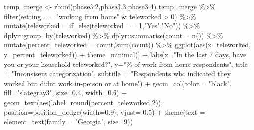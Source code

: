 \documentclass[
]{article}
\newenvironment{Shaded}{\begin{snugshade}}{\end{snugshade}}
\newcommand{\AttributeTok}[1]{\textcolor[rgb]{0.77,0.63,0.00}{#1}}
\newcommand{\DecValTok}[1]{\textcolor[rgb]{0.00,0.00,0.81}{#1}}
\newcommand{\FloatTok}[1]{\textcolor[rgb]{0.00,0.00,0.81}{#1}}
\newcommand{\FunctionTok}[1]{\textcolor[rgb]{0.00,0.00,0.00}{#1}}
\newcommand{\NormalTok}[1]{#1}
\newcommand{\OtherTok}[1]{\textcolor[rgb]{0.56,0.35,0.01}{#1}}
\newcommand{\SpecialCharTok}[1]{\textcolor[rgb]{0.00,0.00,0.00}{#1}}
\newcommand{\StringTok}[1]{\textcolor[rgb]{0.31,0.60,0.02}{#1}}
\begin{document}
\begin{Shaded}
\begin{Highlighting}[]
\NormalTok{temp\_merge }\OtherTok{\textless{}{-}} \FunctionTok{rbind}\NormalTok{(phase3}\FloatTok{.2}\NormalTok{,phase3}\FloatTok{.3}\NormalTok{,phase3}\FloatTok{.4}\NormalTok{)}
\NormalTok{temp\_merge }\SpecialCharTok{\%\textgreater{}\%}
  \FunctionTok{filter}\NormalTok{(setting }\SpecialCharTok{==} \StringTok{"working from home"} \SpecialCharTok{\&}\NormalTok{ teleworked }\SpecialCharTok{\textgreater{}} \DecValTok{0}\NormalTok{) }\SpecialCharTok{\%\textgreater{}\%}
  \FunctionTok{mutate}\NormalTok{(}\AttributeTok{teleworked =} \FunctionTok{if\_else}\NormalTok{(teleworked }\SpecialCharTok{==} \DecValTok{1}\NormalTok{,}\StringTok{"Yes"}\NormalTok{,}\StringTok{"No"}\NormalTok{)) }\SpecialCharTok{\%\textgreater{}\%}
\NormalTok{  dplyr}\SpecialCharTok{::}\FunctionTok{group\_by}\NormalTok{(teleworked) }\SpecialCharTok{\%\textgreater{}\%}
\NormalTok{  dplyr}\SpecialCharTok{::}\FunctionTok{summarise}\NormalTok{(}\AttributeTok{count =} \FunctionTok{n}\NormalTok{()) }\SpecialCharTok{\%\textgreater{}\%}
  \FunctionTok{mutate}\NormalTok{(}\AttributeTok{percent\_teleworked =}\NormalTok{ count}\SpecialCharTok{/}\FunctionTok{sum}\NormalTok{(count)) }\SpecialCharTok{\%\textgreater{}\%}
  \FunctionTok{ggplot}\NormalTok{(}\FunctionTok{aes}\NormalTok{(}\AttributeTok{x=}\NormalTok{teleworked,}
             \AttributeTok{y=}\NormalTok{percent\_teleworked)) }\SpecialCharTok{+} 
  \FunctionTok{theme\_minimal}\NormalTok{() }\SpecialCharTok{+} 
  \FunctionTok{labs}\NormalTok{(}\AttributeTok{x=}\StringTok{"In the last 7 days, have you or your household teleworked?"}\NormalTok{,}
       \AttributeTok{y=}\StringTok{"\% of work from home respondents"}\NormalTok{,}
       \AttributeTok{title =} \StringTok{"Inconsisent categorization"}\NormalTok{,}
       \AttributeTok{subtitle =} \StringTok{"Respondents who indicated they worked but didn\textquotesingle{}t work in{-}person or at home"}\NormalTok{) }\SpecialCharTok{+} 
  \FunctionTok{geom\_col}\NormalTok{(}\AttributeTok{color =} \StringTok{"black"}\NormalTok{,}
           \AttributeTok{fill=}\StringTok{"slategray3"}\NormalTok{,}
           \AttributeTok{size=}\FloatTok{0.4}\NormalTok{,}
           \AttributeTok{width=}\FloatTok{0.6}\NormalTok{) }\SpecialCharTok{+}
  \FunctionTok{geom\_text}\NormalTok{(}\FunctionTok{aes}\NormalTok{(}\AttributeTok{label=}\FunctionTok{round}\NormalTok{(percent\_teleworked,}\DecValTok{2}\NormalTok{)), }
            \AttributeTok{position=}\FunctionTok{position\_dodge}\NormalTok{(}\AttributeTok{width=}\FloatTok{0.9}\NormalTok{), }
            \AttributeTok{vjust=}\SpecialCharTok{{-}}\FloatTok{0.5}\NormalTok{) }\SpecialCharTok{+}
  \FunctionTok{theme}\NormalTok{(}\AttributeTok{text =} \FunctionTok{element\_text}\NormalTok{(}\AttributeTok{family =} \StringTok{"Georgia"}\NormalTok{,}
                            \AttributeTok{size=}\DecValTok{9}\NormalTok{))}
\end{Highlighting}
\end{Shaded}
\end{document}
